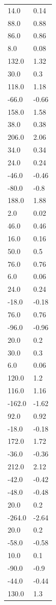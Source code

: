 \begin{longtable}{ll}
14.0 & 0.14 \\
88.0 & 0.88 \\
86.0 & 0.86 \\
8.0 & 0.08 \\
132.0 & 1.32 \\
30.0 & 0.3 \\
118.0 & 1.18 \\
-66.0 & -0.66 \\
158.0 & 1.58 \\
38.0 & 0.38 \\
206.0 & 2.06 \\
34.0 & 0.34 \\
24.0 & 0.24 \\
-46.0 & -0.46 \\
-80.0 & -0.8 \\
188.0 & 1.88 \\
2.0 & 0.02 \\
46.0 & 0.46 \\
16.0 & 0.16 \\
50.0 & 0.5 \\
76.0 & 0.76 \\
6.0 & 0.06 \\
24.0 & 0.24 \\
-18.0 & -0.18 \\
76.0 & 0.76 \\
-96.0 & -0.96 \\
20.0 & 0.2 \\
30.0 & 0.3 \\
6.0 & 0.06 \\
120.0 & 1.2 \\
116.0 & 1.16 \\
-162.0 & -1.62 \\
92.0 & 0.92 \\
-18.0 & -0.18 \\
172.0 & 1.72 \\
-36.0 & -0.36 \\
212.0 & 2.12 \\
-42.0 & -0.42 \\
-48.0 & -0.48 \\
20.0 & 0.2 \\
-264.0 & -2.64 \\
20.0 & 0.2 \\
-58.0 & -0.58 \\
10.0 & 0.1 \\
-90.0 & -0.9 \\
-44.0 & -0.44 \\
130.0 & 1.3 \\

\end{longtable}
